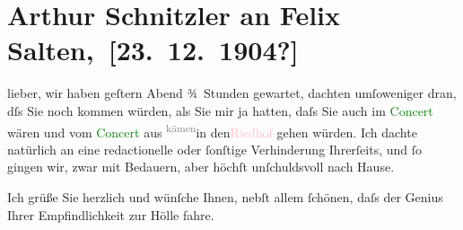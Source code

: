 

\renewcommand{\erwaehntePersonen}{Personen: Felix Salten, Ottilie Salten, Richard Wagner}
\renewcommand{\erwaehnteOrte}{Orte: Oper, Riedhof, Wien}
\renewcommand{\erwaehnteWerke}{Werke: Symphonie Nr. 3 D-Moll, Tristan und Isolde}
\section[ Arthur Schnitzler an Felix Salten, {[}23. 12. 1904?{]}]{Arthur Schnitzler an Felix Salten, {[}23. 12. 1904?{]}}
\nopagebreak{}
\rehead{ }\normalsize\beginnumbering{}
\toendnotes[C]{\smallbreak\pagebreak[2]}
\toendnotes[C]{\smallbreak}
\pstart
           \noindent{}{\pb}lieber, wir haben geſtern{ }Abend ¾ Stunden gewartet, dachten umſoweniger dran, dſs Sie noch kommen
               würden, als Sie mir ja \label{K_L02994-1v}\label{K_L02994-1h} hatten, daſs Sie auch im \textcolor{green}{Concert}{}\ledrightnote{{$\rightarrow$}\textcolor{green}{Symphonie Nr. 3 D-Moll}} wären und vom \textcolor{green}{Concert}{}\ledrightnote{{$\rightarrow$}\textcolor{green}{Symphonie Nr. 3 D-Moll}} aus \substVorne{}\textsuperscript{\textcolor{gray}{kämen}}\substDazwischen{}in den\substHinten{}{ }\textcolor{pink}{Riedhof}{}\ledrightnote{\textcolor{pink}{Riedhof}} gehen {\pb}würden. Ich dachte natürlich an eine
               redactionelle oder ſonſtige Verhinderung Ihrerſeits, und ſo gingen wir, zwar mit
               Bedauern, aber höchſt unſchuldsvoll nach Hause.\pend
           
\pstart
           Ich grüße Sie herzlich und wünſche Ihnen, nebſt allem ſchönen, daſs der Genius Ihrer
                  {\pb}Empfindlichkeit zur Hölle fahre.\pend
           
